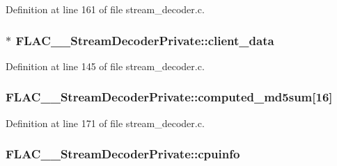 Definition at line 161 of file stream\+\_\+decoder.\+c.

\subsubsection[{\texorpdfstring{client\+\_\+data}{client_data}}]{$\ast$ F\+L\+A\+C\+\_\+\+\_\+\+Stream\+Decoder\+Private\+::client\+\_\+data}\hypertarget{struct_f_l_a_c_____stream_decoder_private_ab0d630682e7baf3be7937bd7354a598e}{}\label{struct_f_l_a_c_____stream_decoder_private_ab0d630682e7baf3be7937bd7354a598e}


Definition at line 145 of file stream\+\_\+decoder.\+c.

\subsubsection[{\texorpdfstring{computed\+\_\+md5sum}{computed_md5sum}}]{ F\+L\+A\+C\+\_\+\+\_\+\+Stream\+Decoder\+Private\+::computed\+\_\+md5sum\mbox{[}16\mbox{]}}\hypertarget{struct_f_l_a_c_____stream_decoder_private_a85e13dc0a97b5eebce89fc6a1f51f547}{}\label{struct_f_l_a_c_____stream_decoder_private_a85e13dc0a97b5eebce89fc6a1f51f547}


Definition at line 171 of file stream\+\_\+decoder.\+c.

\subsubsection[{\texorpdfstring{cpuinfo}{cpuinfo}}]{ F\+L\+A\+C\+\_\+\+\_\+\+Stream\+Decoder\+Private\+::cpuinfo}\hypertarget{struct_f_l_a_c_____stream_decoder_private_af6aa03bcde7829aed52cdb2c770ae66d}{}\label{struct_f_l_a_c_____stream_decoder_private_af6aa03bcde7829aed52cdb2c770ae66d}


